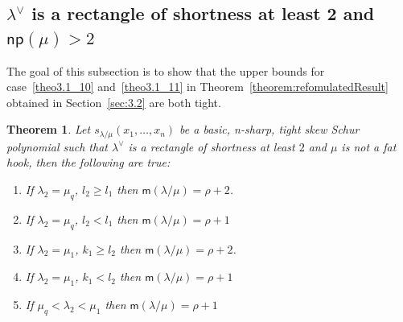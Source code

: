 \documentclass[10pt]{article}
\newtheorem{theorem}{Theorem}[section]
\theoremstyle{definition}
\newcommand{\np}{\mathsf{np}}
\newcommand{\msf}{\mathsf{m}}
\begin{document}
\subsection{\texorpdfstring{$\lambda^\vee$}{lambda vee} is a rectangle of shortness at least 2 and \texorpdfstring{$\np (\mu) > 2$}{np(mu) > 2}}

The goal of this subsection is to show that the upper bounds for case~\ref{theo3.1_10} and~\ref{theo3.1_11} in Theorem~\ref{theorem:refomulatedResult} obtained in Section~\ref{sec:3.2} are both tight. 

\begin{theorem}
\label{thm:necessarynotfathook}
Let $s_{\lambda/\mu}(x_1,\ldots,x_n)$ be a basic, n-sharp, tight skew Schur polynomial such that $\lambda^\vee$ is a rectangle of shortness at least $2$ and $\mu$ is not a fat hook, then the following are true:
\begin{enumerate}[label=(\Roman*)]
 \item\label{theo4.9_1} If $\lambda_2 = \mu_q$, $l_2\geq l_1$ then $\msf (\lambda/\mu) = \rho+2$.
 \item\label{theo4.9_2} If $\lambda_2 = \mu_q$, $l_2< l_1$ then $\msf (\lambda/\mu) = \rho+1$
 \item\label{theo4.9_3} If $\lambda_2 = \mu_1$, $k_1\geq l_2$ then $\msf (\lambda/\mu) = \rho+2$.
 \item\label{theo4.9_4} If $\lambda_2 = \mu_1$, $k_1< l_2$ then $\msf (\lambda/\mu) = \rho+1$
 \item\label{theo4.9_5} If $\mu_q<\lambda_2<\mu_1$ then $\msf (\lambda/\mu) = \rho+1$
\end{enumerate}
\end{theorem}
\end{document}
